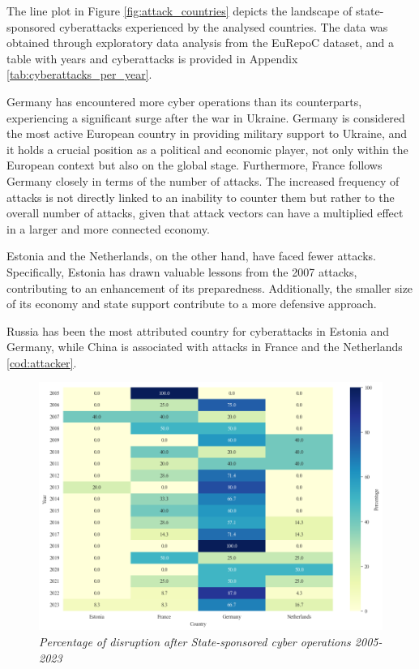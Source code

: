 The line plot in Figure \ref{fig:attack_countries} depicts the landscape of state-sponsored cyberattacks experienced by the analysed countries. The data was obtained through exploratory data analysis from the EuRepoC dataset, and a table with years and cyberattacks is provided in Appendix \ref{tab:cyberattacks_per_year}.

Germany has encountered more cyber operations than its counterparts, experiencing a significant surge after the war in Ukraine. Germany is considered the most active European country in providing military support to Ukraine, and it holds a crucial position as a political and economic player, not only within the European context but also on the global stage. Furthermore, France follows Germany closely in terms of the number of attacks. The increased frequency of attacks is not directly linked to an inability to counter them but rather to the overall number of attacks, given that attack vectors can have a multiplied effect in a larger and more connected economy.

Estonia and the Netherlands, on the other hand, have faced fewer attacks. Specifically, Estonia has drawn valuable lessons from the 2007 attacks, contributing to an enhancement of its preparedness. Additionally, the smaller size of its economy and state support contribute to a more defensive approach.

Russia has been the most attributed country for cyberattacks in Estonia and Germany, while China is associated with attacks in France and the Netherlands \ref{cod:attacker}.

\begin{figure}[H]
    \centering
        \includegraphics[width=1\textwidth]{Images/disruption.png}
        \caption{\textit{Percentage of disruption after State-sponsored cyber operations 2005-2023}}
        \label{fig:disruption}
\end{figure}



